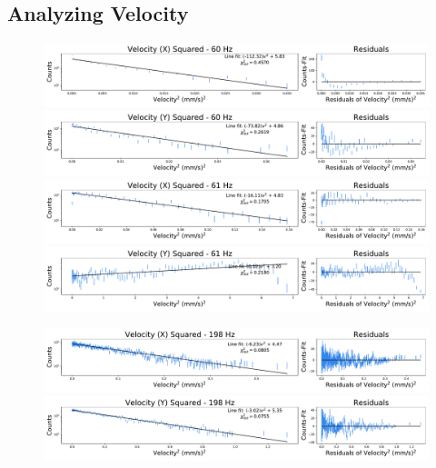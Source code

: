 \documentclass[12pt]{article}
\begin{document}
\subsection{Analyzing Velocity}
\begin{figure}[!ht]
\centering
    \includegraphics[width=\textwidth]{data_01_x_vel.pdf}
    \includegraphics[width=\textwidth]{data_01_y_vel.pdf}
    \includegraphics[width=\textwidth]{data_03_x_vel.pdf}
    \includegraphics[width=\textwidth]{data_03_y_vel.pdf}
	\caption{}
    \label{fig:low_hz_vel}
\end{figure}

\begin{figure}[!ht]
\centering
    \includegraphics[width=\textwidth]{data_04_x_vel.pdf}
    \includegraphics[width=\textwidth]{data_04_y_vel.pdf}
	\caption{}
    \label{fig:high_hz_vel}
\end{figure}
\end{document}
